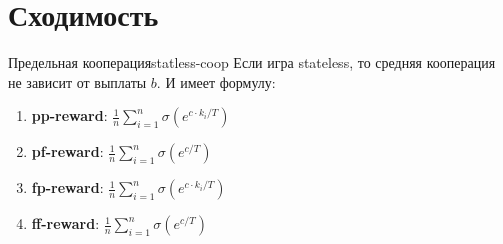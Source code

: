 \documentclass[a4paper, fontsize=14pt]{article}
\theoremstyle{plain}
\theoremstyle{definition}
\begin{document}
\section{Сходимость}
\begin{theorem}{Предельная кооперация}{statless-coop}
    Если игра stateless, то средняя кооперация не зависит от выплаты $b$. И имеет формулу:
    \begin{enumerate}
        \item \textbf{pp-reward}: $\frac{1}{n} \sum_{i=1}^n \sigma(e^{c \cdot k_i / T})$
        \item \textbf{pf-reward}: $\frac{1}{n} \sum_{i=1}^n \sigma(e^{c / T})$
        \item \textbf{fp-reward}: $\frac{1}{n} \sum_{i=1}^n \sigma(e^{c \cdot k_i / T})$
        \item \textbf{ff-reward}: $\frac{1}{n} \sum_{i=1}^n \sigma(e^{c / T})$
    \end{enumerate}
\end{theorem}
\end{document}
